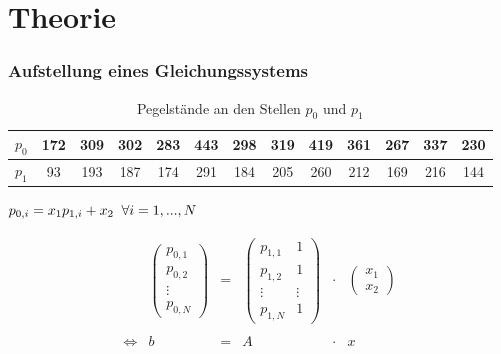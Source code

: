 \documentclass{beamer}
\begin{document}
\section{Theorie}
\begin{frame} %
  \frametitle{Aufstellung eines Gleichungssystems} %
  \tabcolsep=0.11cm
  \begin{table}
    \centering
  \begin{tabular}{c|cccccccccccc}
    $p_0$ & 172 & 309 & 302 & 283 & 443 & 298 & 319 & 419 & 361 & 267 & 337 & 230 \\ \hline
    $p_1$ & 93 & 193 & 187 & 174 & 291 & 184 & 205 & 260 & 212 & 169 & 216 & 144
  \end{tabular}
  \caption{Pegelstände an den Stellen $p_0$ und $p_1$}
\end{table}

\centering
$p_{0,i} = x_1 p_{1,i} + x_2 \thickspace \thickspace \forall i = 1,...,N$
\pause

\begin{equation*}
\begin{array}{cccccc}
&\begin{pmatrix}
  p_{0,1}\\
  p_{0,2}\\
  \vdots \\
  p_{0,N}
\end{pmatrix}
  &=&
\begin{pmatrix}
  p_{1,1} & 1\\
  p_{1,2} & 1\\
  \vdots & \vdots\\
  p_{1,N} & 1
 \end{pmatrix}
  &\cdot&
  \begin{pmatrix}
    x_1\\
    x_2
  \end{pmatrix}\\
  \\
  \iff&b &=& A &\cdot &x
\end{array}
\end{equation*}
\end{frame}
\end{document}
